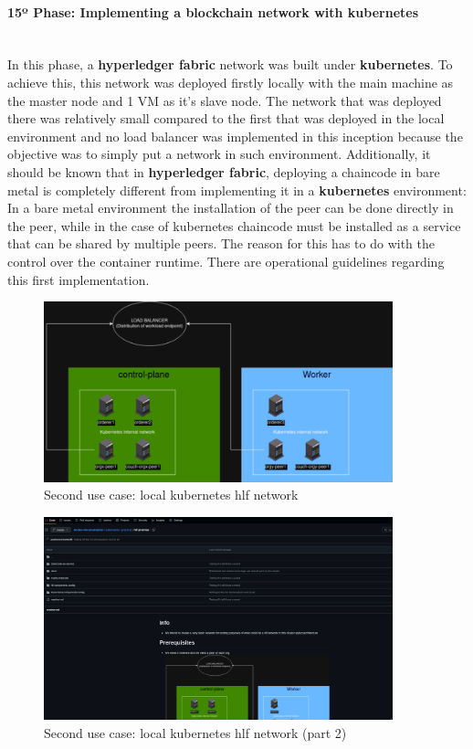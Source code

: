 \paragraph{15º Phase: Implementing a blockchain network with kubernetes}\mbox{}\\
In this phase, a \textbf{hyperledger fabric} network was built under \textbf{kubernetes}. To achieve this, this network was deployed firstly locally with the main machine as the master node and 1 VM as it's slave node. The network that was deployed there was relatively small compared to the first that was deployed in the local environment and no load balancer was implemented in this inception because the objective was to simply put a network in such environment. Additionally, it should be known that in \textbf{hyperledger fabric}, deploying a chaincode in bare metal is completely different from implementing it in a \textbf{kubernetes} environment: In a bare metal environment the installation of the peer can be done directly in the peer, while in the case of kubernetes chaincode must be installed as a service that can be shared by multiple peers. The reason for this has to do with the control over the container runtime. There are operational guidelines regarding this first implementation.

\begin{figure}[H]
    \centering
    \includegraphics[width=0.9\textwidth]{assets/use-case-2/hlf-kuber-premise-network.png} %
    \caption{Second use case: local kubernetes hlf network}
    \label{fig:sample-image} 
\end{figure}

\begin{figure}[H]
    \centering
    \includegraphics[width=0.9\textwidth]{assets/use-case-2/hlf-kuber-premise-network2.png} %
    \caption{Second use case: local kubernetes hlf network (part 2)}
    \label{fig:sample-image} 
\end{figure}

